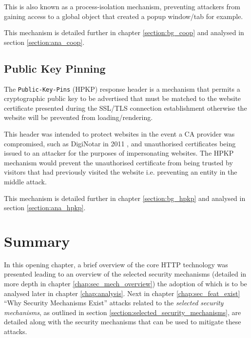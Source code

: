 \documentclass{mscreport}
\begin{document}
\vspace{0.3cm} \noindent
This is also known as a process-isolation mechanism, preventing attackers from gaining access to a global object that created a popup window/tab for example.

\vspace{0.3cm} \noindent
This mechanism is detailed further in chapter \ref{section:bg_coop} and analysed in section \ref{section:ana_coop}.


\subsection{Public Key Pinning}
The \texttt{Public-Key-Pins} (HPKP) response header is a mechanism that permits a cryptographic public key to be advertised that must be matched to the website certificate presented during the SSL/TLS connection establishment otherwise the website will be prevented from loading/rendering.

\vspace{0.3cm} \noindent
This header was intended to protect websites in the event a CA provider was compromised, such as DigiNotar in 2011 \cite{Amann2017-co}, and unauthorised certificates being issued to an attacker for the purposes of impersonating websites. The HPKP mechanism would prevent the unauthorised certificate from being trusted by visitors that had previously visited the website i.e. preventing an entity in the middle attack.

\vspace{0.3cm} \noindent
This mechanism is detailed further in chapter \ref{section:bg_hpkp} and analysed in section \ref{section:ana_hpkp}.
\newpage

%

\section{Summary}

In this opening chapter, a brief overview of the core HTTP technology was presented leading to an overview of the selected security mechanisms (detailed in more depth in chapter \ref{chap:sec_mech_overview}) the adoption of which is to be analysed later in chapter \ref{chap:analysis}. Next in chapter \ref{chap:sec_feat_exist} ``Why Security Mechanisms Exist'' attacks related to the \textit{selected security mechanisms}, as outlined in section \ref{section:selected_security_mechanisms}, are detailed along with the security mechanisms that can be used to mitigate these attacks.
\end{document}

